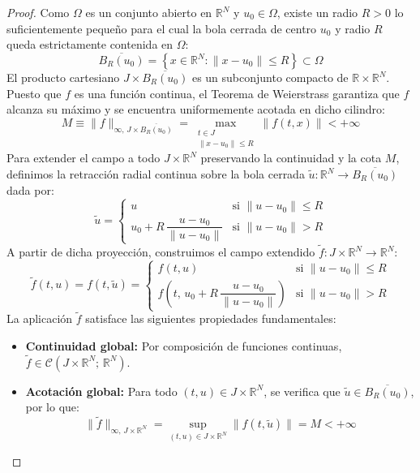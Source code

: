 \begin{proof}
    Como $\Omega$ es un conjunto abierto en $\mathbb{R}^N$ y $u_0 \in \Omega$, existe un radio $R > 0$ lo suficientemente pequeño para el cual la bola cerrada de centro $u_0$ y radio $R$ queda estrictamente contenida en $\Omega$:
    \[
        \overline{B_R(u_0)} = \left\{ x \in \mathbb{R}^N : \|x - u_0\| \leq R \right\} \subset \Omega
    \]
    El producto cartesiano $J \times \overline{B_R(u_0)}$ es un subconjunto compacto de $\mathbb{R} \times \mathbb{R}^N$. Puesto que $f$ es una función continua, el Teorema de Weierstrass garantiza que $f$ alcanza su máximo y se encuentra uniformemente acotada en dicho cilindro:
    \[
        M \equiv \|f\|_{\infty, \, J \times \overline{B_R(u_0)}} = \max_{\substack{t \in J \\ \|x - u_0\| \leq R}} \|f(t, x)\| < +\infty
    \]
    Para extender el campo a todo $J \times \mathbb{R}^N$ preservando la continuidad y la cota $M$, definimos la retracción radial continua sobre la bola cerrada $\tilde{u}: \mathbb{R}^N \to \overline{B_R(u_0)}$ dada por:
    \[
        \tilde{u} =
        \begin{cases}
            u & \text{si } \|u - u_0\| \leq R \\[1ex]
            u_0 + R \, \dfrac{u - u_0}{\|u - u_0\|} & \text{si } \|u - u_0\| > R
        \end{cases}
    \]
    A partir de dicha proyección, construimos el campo extendido $\tilde{f}: J \times \mathbb{R}^N \to \mathbb{R}^N$:
    \[
        \tilde{f}(t, u) = f(t, \tilde{u}) =
        \begin{cases}
            f(t, u) & \text{si } \|u - u_0\| \leq R \\[1ex]
            f\left(t, \, u_0 + R \, \dfrac{u - u_0}{\|u - u_0\|}\right) & \text{si } \|u - u_0\| > R
        \end{cases}
    \]
    La aplicación $\tilde{f}$ satisface las siguientes propiedades fundamentales:
    \begin{itemize}
        \item \textbf{Continuidad global:} Por composición de funciones continuas, $\tilde{f} \in \mathcal{C}(J \times \mathbb{R}^N; \, \mathbb{R}^N)$.
        \item \textbf{Acotación global:} Para todo $(t, u) \in J \times \mathbb{R}^N$, se verifica que $\tilde{u} \in \overline{B_R(u_0)}$, por lo que:
        \[
            \|\tilde{f}\|_{\infty, \, J \times \mathbb{R}^N} = \sup_{(t, u) \in J \times \mathbb{R}^N} \|f(t, \tilde{u})\| = M < +\infty
        \]
    \end{itemize}


\end{proof}
